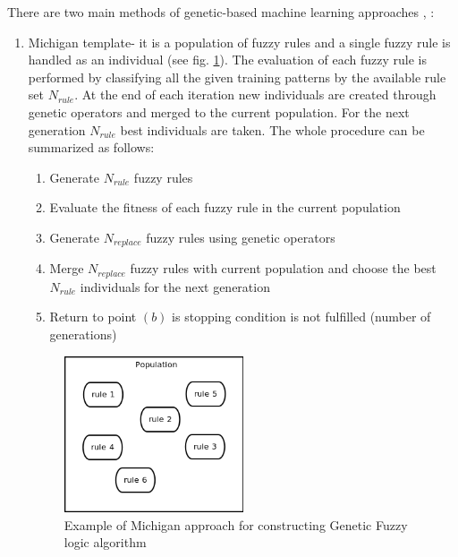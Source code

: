 There are two main methods of genetic-based machine learning approaches
\cite{bib30}, \cite{bib31}:
\begin{enumerate}
    \item Michigan template- it is a population of fuzzy rules and a single
        fuzzy rule is handled as an individual (see fig. \ref{fig:michigan}). 
        The evaluation of each fuzzy rule is performed by classifying all the 
        given training patterns by the available rule set $N_{rule}$. At the 
        end of each iteration new individuals are created through genetic operators 
        and merged to the current population. For the next generation $N_{rule}$ 
        best individuals are taken. The whole procedure can be summarized as follows:
        \begin{enumerate}
            \item Generate $N_{rule}$ fuzzy rules
            \item Evaluate the fitness of each fuzzy rule in the current
                population
            \item Generate $N_{replace}$ fuzzy rules using genetic operators
            \item Merge $N_{replace}$ fuzzy rules with current population and
                choose the best $N_{rule}$ individuals for the next generation
            \item Return to point $(b)$ is stopping condition is not fulfilled
                (number of generations)
        \end{enumerate}
        \begin{figure}[H]
            \begin{center}
                \includegraphics[width=0.5\textwidth, height=0.4\textwidth]{fig/michigan.png}
            \end{center}
            \caption{Example of Michigan approach for constructing Genetic
            Fuzzy logic algorithm}
            \label{fig:michigan}
        \end{figure}

\end{enumerate}
